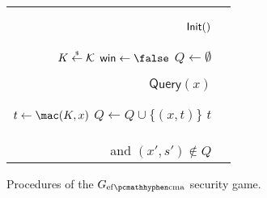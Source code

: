 
	\begin{figure}[ht]
		\centering

		\begin{tabular}{r|l}

			\begin{minipage}[t]{0.40\textwidth}
				\underline{$\mathsf{Init}()$}
				\begin{algorithmic}[0]
					\State $K \stackrel{\scriptscriptstyle{\$}}{\gets} \mathcal{K}$
					\State $\win \gets \false$
					\State $Q \gets \emptyset$
				\end{algorithmic}


				\underline{$\mathsf{Query}(x)$}
				\begin{algorithmic}[0]
					\State $t \gets \MAC(K, x)$
					\State $Q \gets Q \cup \{ (x,t) \}$
					\State \Return $t$
				\end{algorithmic}
				
			\end{minipage}
				&
			\hspace{0.6cm}
			\begin{minipage}[t]{0.45\textwidth}


				\underline{$\mathsf{Challenge}(x', t')$}
				\begin{algorithmic}[0]
					\If{$\verify(K,x', t') = \top$ \\ \tttab and  $(x', s') \notin Q$} 
						\State { $\win \gets \true$}
					\EndIf
				\end{algorithmic}
				
				
				\underline{$\Final()$}
				\begin{algorithmic}[0]
					\State \Return $\win$
				\end{algorithmic}


			\end{minipage}
		\end{tabular}
		
		\caption[$\EFCMA$ security game]{Procedures of the $G_\subgamestyle{\efcma}$ security game.}
		\label{fig:game_cma}
	\end{figure}
	